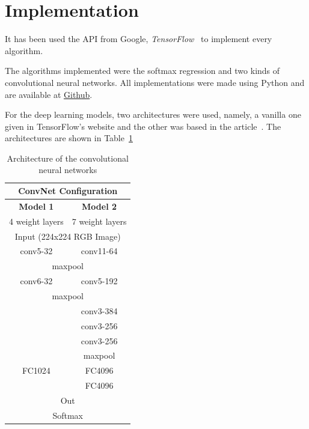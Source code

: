 \documentclass{article}
\begin{document}
\section{Implementation}
  It has been used the API from Google, \emph{TensorFlow}~\cite{tensorflow2015}
  to implement every algorithm.

  The algorithms implemented were the softmax regression and two kinds of
  convolutional neural networks. All implementations were made using Python and
  are available at \href{https://github.com/chronchi/CM116/Projeto}{Github}.

  For the deep learning models, two architectures were used, namely, a vanilla
  one given in TensorFlow's website and the other was based in the
  article~\cite{ImageNet}. The architectures are shown in Table~\ref{tab:archdeep}
  \begin{table}[hbt]
    \centering
    \caption{Architecture of the convolutional neural networks}
    \vskip 1.5mm
    \label{tab:archdeep}
    \begin{tabular}{|c|c|}
      \hline
      \multicolumn{2}{|c|}{ConvNet Configuration}     \\ \hline
      \textbf{Model 1}        & \textbf{Model 2}      \\ \hline
      4 weight layers         & 7 weight layers       \\ \hline
      \multicolumn{2}{|c|}{Input (224x224 RGB Image)} \\ \hline
      conv5-32                & conv11-64             \\ \hline
      \multicolumn{2}{|c|}{maxpool}                   \\ \hline
      conv6-32                & conv5-192             \\ \hline
      \multicolumn{2}{|c|}{maxpool}                   \\ \hline
      \multirow{3}{*}{}       & conv3-384             \\
                              & conv3-256             \\
                              & conv3-256             \\ \cline{2-2}
                              & maxpool               \\ \cline{2-2}
      FC1024                  & FC4096                \\
                              & FC4096                \\ \hline
      \multicolumn{2}{|c|}{Out}                       \\ \hline
      \multicolumn{2}{|c|}{Softmax}                   \\ \hline
    \end{tabular}
  \end{table}
\end{document}
